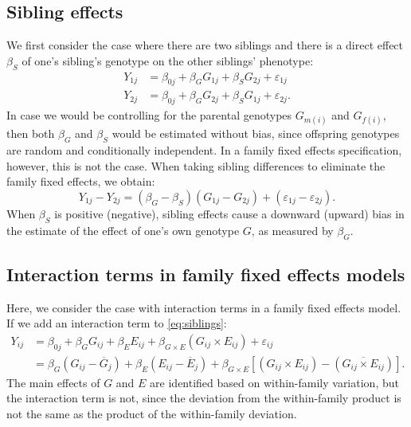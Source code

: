 \documentclass[12pt,a4paper]{article}
\begin{document}
\begin{bibunit}
\subsection{Sibling effects} \label{appsec:siblingbias}


We first consider the case where there are two siblings and there is a direct effect $\beta_S$ of one's sibling's genotype on the other siblings' phenotype:
\begin{align} Y_{1j} &= \beta_{0j} + \beta_G G_{1j} + \beta_S G_{2j} + \varepsilon_{1j} \nonumber\\
 Y_{2j} &= \beta_{0j} + \beta_G G_{2j} + \beta_S G_{1j} + \varepsilon_{2j}. 
 \end{align}
In case we would be controlling for the parental genotypes $G_{m(i)}$ and $G_{f(i)}$, then both $\beta_G$ and $\beta_S$ would be estimated without bias, since offspring genotypes are random and conditionally independent. In a family fixed effects specification, however, this is not the case. 
When taking sibling differences to eliminate the family fixed effects, we obtain:
\[ Y_{1j}-Y_{2j} = \left(\beta_G - \beta_S\right) \left(G_{1j}-G_{2j} \right) + \left(\varepsilon_{1j}-\varepsilon_{2j}\right). \]
When $\beta_S$ is positive (negative), sibling effects cause a downward (upward) bias in the estimate of the effect of one's own genotype $G$, as measured by $\beta_G$.

\subsection{Interaction terms in family fixed effects models} \label{appsec:interactionfe}
Here, we consider the case with interaction terms in a family fixed effects model. If we add an interaction term to \autoref{eq:siblings}: 
\begin{align}
Y_{ij} &= \beta_{0j} + \beta_G G_{ij} + \beta_E E_{ij} + \beta_{G \times E} \left(G_{ij}\times E_{ij}\right) + \varepsilon_{ij} \nonumber\\
&= \beta_G \left(G_{ij}-\overline{G}_j\right) + \beta_E \left(E_{ij}-\overline{E}_j\right) + \beta_{G \times E} \left[ \left(G_{ij}\times E_{ij}\right)-\left(\overline{G_{ij}\times E_{ij}}\right)\right].
\label{eq:interactionfe}
\end{align}
The main effects of $G$ and $E$ are identified based on within-family variation, but the interaction term is not, since the deviation from the within-family product is not the same as the product of the within-family deviation. 


\end{bibunit}
\end{document}
